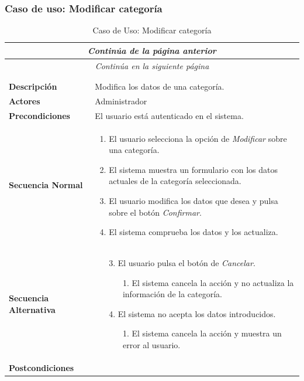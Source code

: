 \newpage
\subsubsection*{Caso de uso: Modificar categoría }
\begin{longtable}{| p{4cm} | p{10cm} |}
\endfirsthead
\multicolumn{2}{c}{\textit{Continúa de la página anterior}}\\[12pt]
\hline
\endhead
\hline
\multicolumn{2}{c}{\textit{Continúa en la siguiente página}} \\
\endfoot
\hline
\caption{Caso de Uso: Modificar categoría}\label{fig:1}\\
\endlastfoot


\hline
\multicolumn{2}{|c|}{\textbf{CU$<$43$>$ - Modificar Categoría}} \\

\hline
\textbf{Descripción} &
Modifica los datos de una categoría.\\

\hline
\textbf{Actores} &
Administrador\\

\hline
\textbf{Precondiciones} &
El usuario está autenticado en el sistema.\\

\hline
\textbf{Secuencia Normal} &\mbox{}\par\vspace{-\baselineskip}
\begin{enumerate}[leftmargin=0.7cm, topsep=0.1cm]
\item El usuario selecciona la opción de \textit{Modificar} sobre una categoría.
\item El sistema muestra un formulario con los datos actuales de la categoría seleccionada.
\item El usuario modifica los datos que desea y pulsa sobre el botón \textit{Confirmar}.
\item El sistema comprueba los datos y los actualiza.
\end{enumerate}


\\
\hline
\textbf{Secuencia Alternativa} &\mbox{}\par\vspace{-\baselineskip}
\begin{enumerate}[leftmargin=0.9cm, topsep=0.1cm]
\item[3.] El usuario pulsa el botón de \textit{Cancelar}.
	\begin{itemize}
	\item[1.] El sistema cancela la acción y no actualiza la información de la categoría.
	\end{itemize}
\item[4.] El sistema no acepta los datos introducidos.
	\begin{itemize}
	\item[1.] El sistema cancela la acción y muestra un error al usuario.
	\end{itemize}
\end{enumerate}
\\

\hline
\textbf{Postcondiciones} & \\
\hline
\end{longtable}
